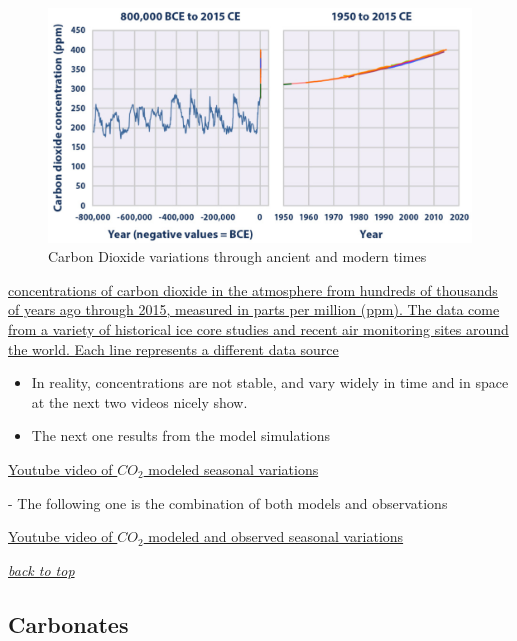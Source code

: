 \documentclass[]{book}
\theoremstyle{definition}
\theoremstyle{definition}
\theoremstyle{definition}
\theoremstyle{remark}
\begin{document}
\begin{figure}
\centering
\includegraphics{pictures/CO2_atm_concentrations.png}
\caption{Carbon Dioxide variations through ancient and modern times}
\end{figure}

\href{https://https://www.epa.gov/sites/production/files/2016-08/documents/print_ghg-concentrations-2016.pdf}{concentrations
of carbon dioxide in the atmosphere from hundreds of thousands of years
ago through 2015, measured in parts per million (ppm). The data come
from a variety of historical ice core studies and recent air monitoring
sites around the world. Each line represents a different data source}
\citep{Epa2016-yj}

\begin{itemize}
\item
  In reality, concentrations are not stable, and vary widely in time and
  in space at the next two videos nicely show.
\item
  The next one results from the model simulations
\end{itemize}

\href{https://www.youtube.com/embed/WGHkY0E4FMY}{Youtube video of
\(CO_2\) modeled seasonal variations}

 - The following one is the combination of both models and observations

\href{https://www.youtube.com/embed/2BWWrJr6TJw}{Youtube video of
\(CO_2\) modeled and observed seasonal variations}

\emph{\protect\hyperlink{top}{back to top}}

\subsection{Carbonates}\label{carbonates}
\end{document}
